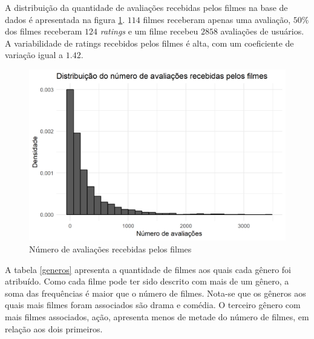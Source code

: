 \documentclass[12pt,a4paper,header]{abnt}
\begin{document}
A distribuição da quantidade de avaliações recebidas pelos filmes na base de dados é apresentada na figura \ref{filmes_ratings}. $114$ filmes receberam apenas uma avaliação, $50\%$ dos filmes receberam $124$ \textit{ratings} e um filme recebeu $2858$ avaliações de usuários. A variabilidade de ratings recebidos pelos filmes é alta, com um coeficiente de variação igual a $1.42$.

\begin{figure}[h]
\centering
\includegraphics[]{../R/img/ratings_filmes.png}
\caption{Número de avaliações recebidas pelos filmes}
\label{filmes_ratings}
\end{figure}

A tabela \ref{generos} apresenta a quantidade de filmes aos quais cada gênero foi atribuído. Como cada filme pode ter sido descrito com mais de um gênero, a soma das frequências é maior que o número de filmes. Nota-se que os gêneros aos quais mais filmes foram associados são drama e comédia. O terceiro gênero com mais filmes associados, ação, apresenta menos de metade do número de filmes, em relação aos dois primeiros.
\end{document}

